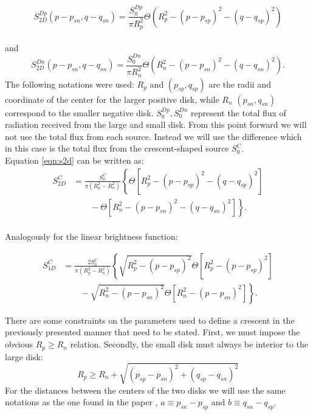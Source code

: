 \documentclass[usenatbib]{mn2e}
\begin{document}
\begin{equation}
 S_{2D}^{Dp}(p-p_{sn}, q-q_{sn}) = \frac{S_0^{Dp}}{\pi R_p^2} \Theta \left( R_p^2 - \left( p-p_{sp} \right)^2 - \left( q-q_{sp} \right)^2 \right)
\end{equation}
\\
and
\begin{equation}
 S_{2D}^{Dn}(p-p_{sn}, q-q_{sn}) = \frac{S_0^{Dn}}{\pi R_n^2} \Theta \left( R_n^2 - \left( p-p_{sn} \right)^2 - \left( q-q_{sn} \right)^2 \right).
\end{equation}
The following notations were used: $R_p$ and $(p_{sp}, q_{sp})$ are
the radii and coordinate of the center for the larger positive disk, 
while $R_n$ $(p_{sn},q_{sn})$ correspond to the smaller negative disk. 
$S_0^{Dp},S_0^{Dn}$ represent the total flux of radiation received from the large and small disk. 
From this point forward we will not use the total flux from each source. Instead we will 
use the difference which in this case is the total flux from the crescent-shaped source $S_0^C$. \\
Equation \ref{eqn:s2d} can be written as:\\

\begin{align}
 S_{2D}^C &= \frac{S_0^C}{\pi \left(R_p^2-R_n^2 \right)} \left\{ \Theta \left[ R_p^2 - \left( p-p_{sp} \right)^2 - \left( q-q_{sp} \right)^2 \right] \right.\nonumber\\
 &\qquad \left. {} -  \Theta \left[ R_n^2 - \left( p-p_{sn} \right)^2 - \left( q-q_{sn} \right)^2 \right] \right\}.
\end{align}
\\
Analogously for the linear brightness function:

\begin{align}
 S_{1D}^C &= \frac{2 S_0^C}{\pi \left(R_p^2-R_n^2 \right)} \left\{ \sqrt{R_p^2 - (p-p_{sp})^2}  \Theta \left[ R_p^2 - \left( p-p_{sp} \right)^2 \right] \right.\nonumber\\
 &\qquad \left. {} - \sqrt{R_n^2 - (p-p_{sn})^2 } \Theta \left[ R_n^2 - \left( p-p_{sn} \right)^2 \right] \right\}.
\label{eqn:s1_d}
\end{align}


There are some constraints on the parameters used to define a crescent
in the previously presented manner that need to be stated. First, we
must impose the obvious $R_p \geq R_n$ relation. Secondly, the small disk
must always be interior to the large disk:
\begin{equation}
 R_p \ge R_n + \sqrt{\left(p_{sp} - p_{sn} \right)^2 + \left(q_{sp} - q_{sn} \right)^2}
\end{equation}
For the distances between the centers of the two disks we will use the same 
notations as the one found in the paper \citep{2013MNRAS.434..765K}, $a \equiv p_{sn} - p_{sp}$ and $b \equiv q_{sn} - q_{sp}$.
\end{document}
